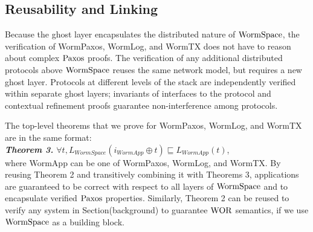 

\subsection{Reusability and Linking}
\label{subsec:proof_effort}

Because the ghost layer encapsulates the distributed nature of $\mathrm{WormSpace}$, the verification of WormPaxos, WormLog, and WormTX does not have to reason about complex $\mathrm{Paxos}$ proofs. %
The verification of any additional distributed protocols above $\mathrm{WormSpace}$ reuses the same network model, but requires a new ghost layer. Protocols at different levels of the stack are independently verified within separate ghost layers; invariants of interfaces to the protocol and contextual refinement proofs guarantee non-interference among protocols. 

The top-level theorems that we prove for WormPaxos, WormLog, and WormTX are in the same format:\\
\textit{\textbf{Theorem 3.} $\forall t, L_{WormSpace} (i_{WormApp} \oplus t) \sqsubseteq L_{WormApp} (t)$},\\
where WormApp can be one of WormPaxos, WormLog, and WormTX.
By reusing Theorem 2 and transitively combining it with Theorems 3, applications are guaranteed to be correct with respect to all layers of $\mathrm{WormSpace}$ and to encapsulate verified $\mathrm{Paxos}$ properties. Similarly, Theorem 2 can be reused to verify any system in Section(background) to guarantee $\mathrm{WOR}$ semantics, if we use $\mathrm{WormSpace}$ as a building block. 


